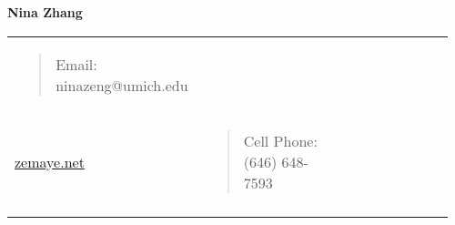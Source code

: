 \documentclass[11pt,a4paper]{article}
\begin{document}
\textbf{Nina Zhang}

\begin{longtable}[]{@{}
  >{\raggedright\arraybackslash}p{0.32\linewidth}
  >{\raggedright\arraybackslash}p{0.32\linewidth}
  >{\raggedright\arraybackslash}p{0.32\linewidth}@{}}
\toprule\noalign{}
\begin{minipage}[b]{\linewidth}\raggedright
\begin{quote}
Email: ninazeng@umich.edu
\end{quote}
\end{minipage} & \begin{minipage}[b]{\linewidth}\centering
\url{github.com/zemaye1}\\
\url{zemaye.net}
\end{minipage} & \begin{minipage}[b]{\linewidth}\raggedright
\begin{quote}
Cell Phone: (646) 648-7593
\end{quote}
\end{minipage} \\
\midrule\noalign{}
\endhead
\bottomrule\noalign{}
\endlastfoot
\end{longtable}
\end{document}

